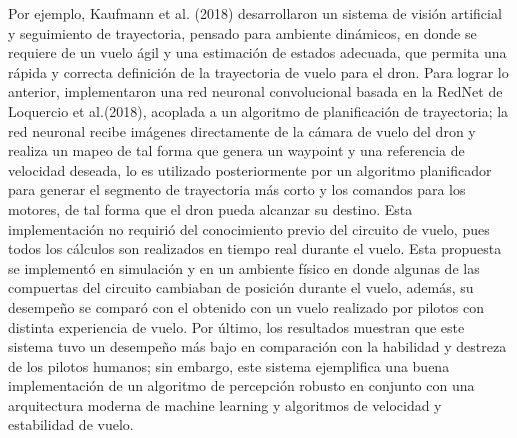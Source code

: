 Por ejemplo, Kaufmann et al. (2018) \cite{kaufmann2018deep} desarrollaron un sistema de visión artificial y seguimiento de trayectoria, pensado para ambiente dinámicos, en donde se requiere de un vuelo ágil y una estimación de estados adecuada, que permita una rápida y correcta definición de la trayectoria de vuelo para el dron. 
Para lograr lo anterior, implementaron una red neuronal convolucional basada en la RedNet de Loquercio et al.(2018)\cite{loquercio2018dronet}, acoplada a un algoritmo de planificación de trayectoria; la red neuronal recibe imágenes directamente de la cámara de vuelo del dron y realiza un mapeo de tal forma que genera un waypoint y una referencia de velocidad deseada, lo es utilizado posteriormente por un algoritmo planificador para generar el segmento de trayectoria más corto y los comandos para los motores, de tal forma que el dron pueda alcanzar su destino. Esta implementación no requirió del conocimiento previo del circuito de vuelo, pues todos los cálculos son realizados en tiempo real durante el vuelo. Esta propuesta se implementó en simulación y en un ambiente físico en donde algunas de las compuertas del circuito cambiaban de posición durante el vuelo, además, su desempeño se comparó con el obtenido con un vuelo realizado por pilotos con distinta experiencia de vuelo. Por último, los resultados muestran que este sistema tuvo un desempeño más bajo en comparación con la habilidad y destreza de los pilotos humanos; sin embargo, este sistema ejemplifica una buena implementación de un algoritmo de percepción robusto en conjunto con una arquitectura moderna de machine learning y algoritmos de velocidad y estabilidad de vuelo. 